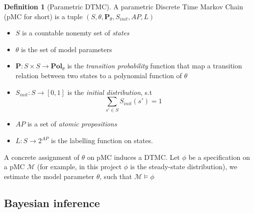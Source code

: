 \documentclass[12pt]{article}
\theoremstyle{definition}
\newtheorem{definition}{Definition}[section]
\begin{document}
\begin{definition}[Parametric DTMC]
  A parametric Discrete Time Markov Chain (pMC for short) is a tuple $(S,\theta,
  \mathbf{P}_\theta, S_{init}, AP,
  L)$
  \begin{itemize}
  \item $S$ is a countable nonemty set of \textit{states}
  \item $\theta$ is the set of model parameters
  \item $\mathbf{P}:S \times S \rightarrow \mathbf{Pol}_\theta$ is the \textit{transition probability}
    function that map a transition relation between two states to a polynomial
    function of $\theta$
  \item $S_{init}: S \rightarrow [0,1]$ is the \textit{initial distribution},
    s.t  $$\sum_{s'\in S}S_{init}(s') = 1$$
  \item $AP$ is a set of \textit{atomic propositions}
  \item $L: S \rightarrow 2^{AP}$ is the labelling function on states.
  \end{itemize}
\end{definition}
A concrete assignment of $\theta$ on pMC induces a DTMC. Let $\phi$ be a
specification on a pMC $\mathcal{M}$ (for example, in this project $\phi$ is the
steady-state distribution), we estimate the model parameter $\theta$, such that
$\mathcal{M} \models \phi$


\subsection{Bayesian inference}
\end{document}
